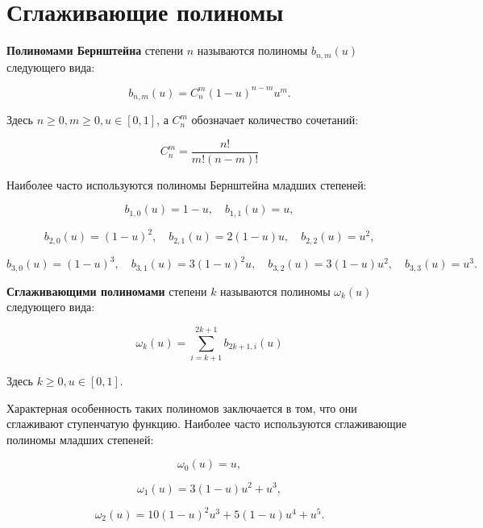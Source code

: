 \section{Сглаживающие полиномы}

\begin{definition}
\textbf{Полиномами Бернштейна} степени $n$ называются полиномы $b_{n,m}(u)$ следующего вида:

$$
b_{n,m}(u)=C_n^m(1-u)^{n-m}u^m.
$$
\end{definition}

Здесь $n \ge 0, m \ge 0, u \in [0,1]$, а $C_n^m$ обозначает количество сочетаний:

$$
C_n^m=\frac{n!}{m!(n-m)!}
$$

Наиболее часто используются полиномы Бернштейна младших степеней:

$$
b_{1,0}(u)=1-u, \quad b_{1,1}(u)=u,
$$

$$
b_{2,0}(u)=(1-u)^2, \quad b_{2,1}(u)=2(1-u)u, \quad b_{2,2}(u)=u^2,
$$

$$
b_{3,0}(u)=(1-u)^3, \quad b_{3,1}(u)=3(1-u)^2u, \quad b_{3,2}(u)=3(1-u)u^2, \quad b_{3,3}(u)=u^3.
$$

\begin{definition}
\textbf{Сглаживающими полиномами} степени $k$ называются полиномы $\omega_k(u)$ следующего вида:

$$
\omega_k(u)=\sum_{i=k+1}^{2k+1}b_{2k+1,i}(u)
$$
\end{definition}

Здесь $k \ge 0, u \in [0,1]$.

Характерная особенность таких полиномов заключается в том, что они сглаживают ступенчатую функцию. Наиболее часто
используются сглаживающие полиномы младших степеней:

$$
\omega_0(u)=u,
$$

$$
\omega_1(u)=3(1-u)u^2+u^3,
$$

$$
\omega_2(u)=10(1-u)^2u^3+5(1-u)u^4+u^5.
$$
